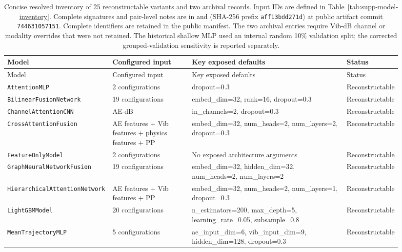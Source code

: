 \begingroup
\footnotesize
\setlength{\tabcolsep}{3.5pt}
\begin{longtable}{@{}p{0.23\linewidth}p{0.20\linewidth}p{0.39\linewidth}p{0.12\linewidth}@{}}
\caption{Concise resolved inventory of 25 reconstructable variants and two archival records. Input IDs are defined in Table~\ref{tab:supp-model-inventory}. Complete signatures and pair-level notes are in  and  (SHA-256 prefix \texttt{aff13bdd271d}) at public artifact commit \texttt{744631057151}. Complete identifiers are retained in the public manifest. The two archival entries require Vib-dB channel or modality overrides that were not retained. The historical shallow MLP used an internal random 10\% validation split; the corrected grouped-validation sensitivity is reported separately.}
\label{tab:supp-model-constructors}\\
\toprule
Model & Configured input & Key exposed defaults & Status \\
\midrule
\endfirsthead
\toprule
Model & Configured input & Key exposed defaults & Status \\
\midrule
\endhead
\texttt{AttentionMLP} & 2 configurations & dropout=0.3 & Reconstructable \\
\texttt{BilinearFusionNetwork} & 19 configurations & embed\_dim=32, rank=16, dropout=0.3 & Reconstructable \\
\texttt{ChannelAttentionCNN} & AE-dB & in\_channels=2, dropout=0.3 & Reconstructable \\
\texttt{CrossAttentionFusion} & AE features + Vib features + physics features + PP & embed\_dim=32, num\_heads=2, num\_layers=2, dropout=0.3 & Reconstructable \\
\texttt{FeatureOnlyModel} & 2 configurations & No exposed architecture arguments & Reconstructable \\
\texttt{GraphNeuralNetworkFusion} & 19 configurations & embed\_dim=32, hidden\_dim=32, num\_heads=2, num\_layers=2 & Reconstructable \\
\texttt{HierarchicalAttentionNetwork} & AE features + Vib features + PP & embed\_dim=32, num\_heads=2, num\_layers=1, dropout=0.3 & Reconstructable \\
\texttt{LightGBMModel} & 20 configurations & n\_estimators=200, max\_depth=5, learning\_rate=0.05, subsample=0.8 & Reconstructable \\
\texttt{MeanTrajectoryMLP} & 5 configurations & ae\_input\_dim=6, vib\_input\_dim=9, hidden\_dim=128, dropout=0.3 & Reconstructable \\

\end{longtable}
